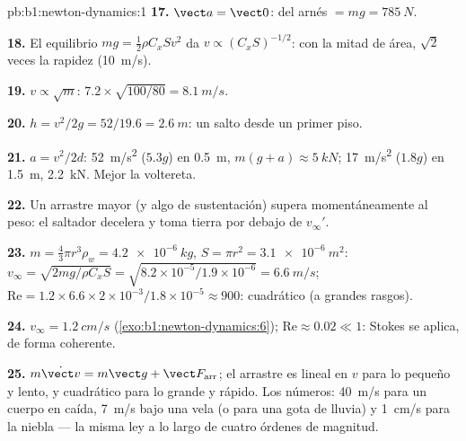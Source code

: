 \begin{solution}{pb:b1:newton-dynamics:1}
\textbf{17.} $\vect a = \vect 0$:  del arnés $= mg = \qty{785}{N}$.

\textbf{18.} El equilibrio $mg = \tfrac12\rho C_xSv^2$ da $v \propto (C_xS)^{-1/2}$:
con la mitad de área, $\sqrt2$ veces la rapidez (\qty{10}{m/s}).

\textbf{19.} $v \propto \sqrt m$: $7.2 \times \sqrt{100/80} = \qty{8.1}{m/s}$.

\textbf{20.} $h = v^2/2g = 52/19.6 = \qty{2.6}{m}$: un salto desde un
primer piso.

\textbf{21.} $a = v^2/2d$: \qty{52}{m/s^2} ($5.3g$) en \qty{0.5}{m},
 $m(g + a) \approx \qty{5}{kN}$; \qty{17}{m/s^2} ($1.8g$) en
\qty{1.5}{m}, \qty{2.2}{kN}. Mejor la voltereta.

\textbf{22.} Un arrastre mayor (y algo de sustentación) supera
momentáneamente al peso: el saltador decelera y toma tierra por debajo de $v_\infty'$.

\textbf{23.} $m = \tfrac43\pi r^3\rho_w = \qty{4.2e-6}{kg}$, $S = \pi r^2 =
\qty{3.1e-6}{m^2}$: $v_\infty = \sqrt{2mg/\rho C_xS} = \sqrt{8.2\times10^{-5}/
1.9\times10^{-6}} = \qty{6.6}{m/s}$; $\mathrm{Re} = 1.2 \times 6.6 \times
2\times10^{-3}/1.8\times10^{-5} \approx 900$: cuadrático (a grandes rasgos).

\textbf{24.} $v_\infty = \qty{1.2}{cm/s}$ (\cref{exo:b1:newton-dynamics:6});
$\mathrm{Re} \approx 0.02 \ll 1$: Stokes se aplica, de forma coherente.

\textbf{25.} $m\dot{\vect v} = m\vect g + \vect F_{\text{arr}}$; el
arrastre es lineal en $v$ para lo pequeño y lento, y cuadrático para lo
grande y rápido. Los números: \qty{40}{m/s} para un cuerpo en caída,
\qty{7}{m/s} bajo una vela (o para una gota de lluvia) y \qty{1}{cm/s}
para la niebla --- la misma ley a lo largo de cuatro órdenes de magnitud.
\end{solution}
